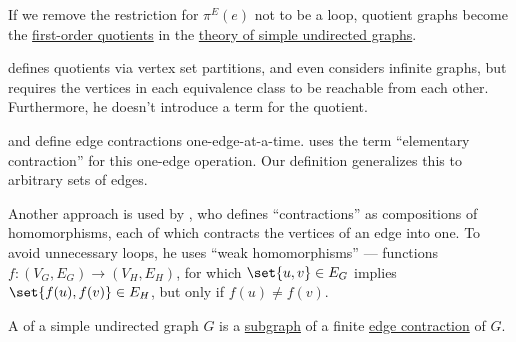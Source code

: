 \begin{comments}
  \item If we remove the restriction for \( \pi^E(e) \) not to be a loop, quotient graphs become the \hyperref[def:fol_quotient_structure]{first-order quotients} in the \hyperref[rem:logical_theory_of_graphs]{theory of simple undirected graphs}.

  \item \Textcite[19]{Diestel2017GraphTheory} defines quotients via vertex set partitions, and even considers infinite graphs, but requires the vertices in each equivalence class to be reachable from each other. Furthermore, he doesn't introduce a term for the quotient.

  \item \Textcite[24]{Bollobás1998ModernGraphTheory} and \textcite[21]{ЕмеличевИПр1990ТеорияГрафов} define edge contractions one-edge-at-a-time. \Textcite[113]{Harary1969GraphTheory} uses the term \enquote{elementary contraction} for this one-edge operation. Our definition generalizes this to arbitrary sets of edges.

  \item Another approach is used by \textcite[def. 1.4.6]{Knauer2019AlgebraicGraphTheory}, who defines \enquote{contractions} as compositions of homomorphisms, each of which contracts the vertices of an edge into one. To avoid unnecessary loops, he uses \enquote{weak homomorphisms} --- functions \( f: (V_G, E_G) \to (V_H, E_H) \), for which \( \set{ u, v } \in E_G \) implies \( \set{ f(u), f(v) } \in E_H \), but only if \( f(u) \neq f(v) \).
\end{comments}

\begin{definition}\label{def:graph_minor}
  A  of a simple undirected graph \( G \) is a \hyperref[def:undirected_graph/subobject]{subgraph} of a finite \hyperref[def:quotient_graph/edge]{edge contraction} of \( G \).
\end{definition}
